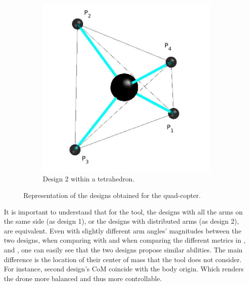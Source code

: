 \begin{figure}[!ht]
{  \hspace*{\fill} %
  \begin{subfigure}[b]{0.4\textwidth}
    \includegraphics[width=\linewidth]{images/Quad_tetrahedron.jpg}
    \caption{Design 2 within a tetrahedron.} \label{fig:Quadcopter_2_tetra}
  \end{subfigure}}
  \caption{Representation of the designs obtained for the quad-copter.}
  \label{fig:Quadcopter_result}
\end{figure}

It is important to understand that for the tool, the designs with all the arms
on the same side (as design 1), or the designs with distributed arms (as design 2),
are equivalent. Even with slightly different arm angles’ magnitudes
between the two designs, when comparing with
 and when comparing the different metrics
in ,  and
, one can easily see that the two designs
propose similar abilities. The main difference is the location of their center of mass
that the tool does not consider. For instance, second design’s CoM coincide with
the body origin. Which renders the drone more balanced and thus more controllable.

